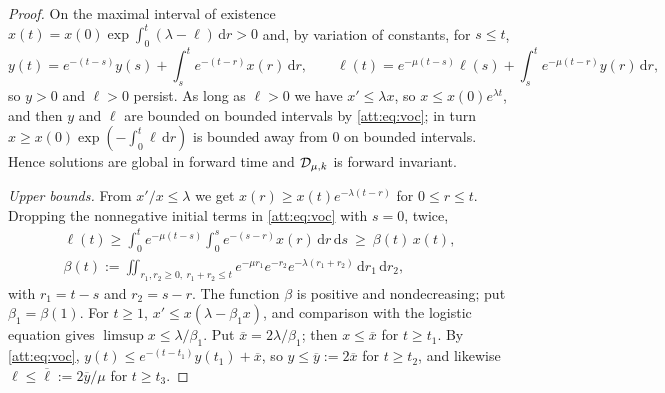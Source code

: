 \begin{proof}
On the maximal interval of existence $x(t)=x(0)\exp\int_0^t(\lambda-\ell)\,\mathrm dr>0$ and, by variation of constants, for $s\le t$,
\begin{equation}\label{att:eq:voc}
y(t)=e^{-(t-s)}y(s)+\int_s^te^{-(t-r)}x(r)\,\mathrm dr,\qquad \ell(t)=e^{-\mu(t-s)}\ell(s)+\int_s^te^{-\mu(t-r)}y(r)\,\mathrm dr ,
\end{equation}
so $y>0$ and $\ell>0$ persist. As long as $\ell>0$ we have $x'\le\lambda x$, so $x\le x(0)e^{\lambda t}$, and then $y$ and $\ell$ are bounded on bounded intervals by \eqref{att:eq:voc}; in turn $x\ge x(0)\exp(-\int_0^t\ell\,\mathrm dr)$ is bounded away from $0$ on bounded intervals. Hence solutions are global in forward time and $\mathcal D_{\mu,k}$ is forward invariant.

\emph{Upper bounds.} From $x'/x\le\lambda$ we get $x(r)\ge x(t)e^{-\lambda(t-r)}$ for $0\le r\le t$. Dropping the nonnegative initial terms in \eqref{att:eq:voc} with $s=0$, twice,
\begin{gather*}
\ell(t)\ge\int_0^te^{-\mu(t-s)}\!\!\int_0^se^{-(s-r)}x(r)\,\mathrm dr\,\mathrm ds\ \ge\ \beta(t)\,x(t),\\
\beta(t):=\iint_{r_1,r_2\ge0,\ r_1+r_2\le t}e^{-\mu r_1}e^{-r_2}e^{-\lambda(r_1+r_2)}\,\mathrm dr_1\,\mathrm dr_2 ,
\end{gather*}
with $r_1=t-s$ and $r_2=s-r$. The function $\beta$ is positive and nondecreasing; put $\beta_1=\beta(1)$. For $t\ge1$, $x'\le x(\lambda-\beta_1x)$, and comparison with the logistic equation gives $\limsup x\le\lambda/\beta_1$. Put $\overline x=2\lambda/\beta_1$; then $x\le\overline x$ for $t\ge t_1$. By \eqref{att:eq:voc}, $y(t)\le e^{-(t-t_1)}y(t_1)+\overline x$, so $y\le\overline y:=2\overline x$ for $t\ge t_2$, and likewise $\ell\le\overline\ell:=2\overline y/\mu$ for $t\ge t_3$.


\end{proof}
